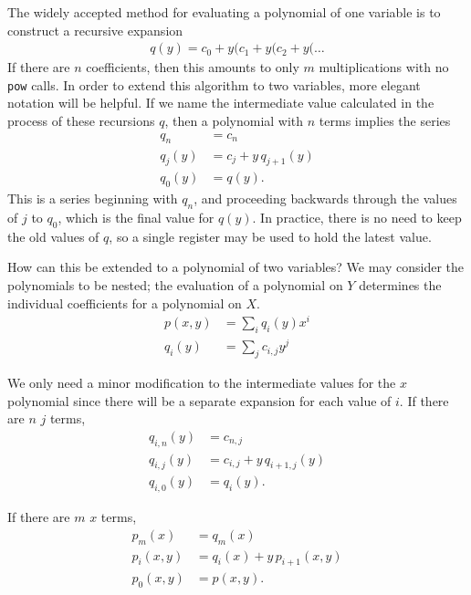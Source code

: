 \documentclass[twocolumn,letterpaper,11pt]{article}
\begin{document}
The widely accepted method for evaluating a polynomial of one variable is to construct a recursive expansion
\begin{align}
q(y) = c_0 + y ( c_1 + y ( c_2 + y ( \ldots
\end{align}
If there are $n$ coefficients, then this amounts to only $m$ multiplications with no \verb|pow| calls.  In order to extend this algorithm to two variables, more elegant notation will be helpful.  If we name the intermediate value calculated in the process of these recursions $q$, then a polynomial with $n$ terms implies the series
\begin{align}
q_n &= c_n\\
q_j(y) &= c_j + y\,q_{j+1}(y)\\
q_0(y) &= q(y).
\end{align}
This is a series beginning with $q_n$, and proceeding backwards through the values of $j$ to $q_0$, which is the final value for $q(y)$.  In practice, there is no need to keep the old values of $q$, so a single register may be used to hold the latest value.

How can this be extended to a polynomial of two variables?  We may consider the polynomials to be nested; the evaluation of a polynomial on $Y$ determines the individual coefficients for a polynomial on $X$.
\begin{align}
p(x,y) &= \sum_i q_i(y) x^i\\
q_i(y) &= \sum_j c_{i,j} y^j
\end{align}

We only need a minor modification to the intermediate values for the $x$ polynomial since there will be a separate expansion for each value of $i$.  If there are $n$ $j$ terms,
\begin{subequations}
\begin{align}
q_{i,n}(y) &= c_{n,j}\\
q_{i,j}(y) &= c_{i,j} + y\,q_{i+1,j}(y)\\
q_{i,0}(y) &= q_i(y).
\end{align}
\end{subequations}

If there are $m$ $x$ terms,
\begin{subequations}
\begin{align}
p_m(x) &= q_m(x)\\
p_i(x,y) &= q_i(x) + y\,p_{i+1}(x,y)\\
p_0(x,y) &= p(x,y).
\end{align}
\end{subequations}
\end{document}
